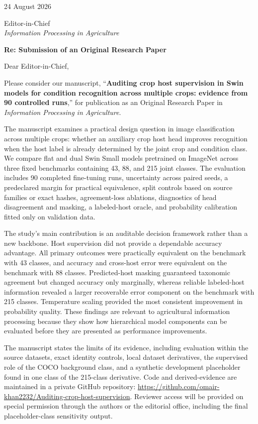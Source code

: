 \documentclass[10pt]{article}
\begin{document}
24 August 2026

Editor-in-Chief\\
\emph{Information Processing in Agriculture}

\textbf{Re: Submission of an Original Research Paper}

Dear Editor-in-Chief,

Please consider our manuscript, ``\textbf{Auditing crop host supervision in
Swin models for condition recognition across multiple crops: evidence from 90
controlled runs},'' for publication as an Original Research Paper in
\emph{Information Processing in Agriculture}.

The manuscript examines a practical design question in image classification
across multiple crops: whether an auxiliary crop host head improves recognition
when the host label is already determined by the joint crop and condition class.
We compare flat and dual Swin Small models pretrained on ImageNet across three
fixed benchmarks containing 43, 88, and 215 joint classes. The evaluation
includes 90 completed fine-tuning runs, uncertainty across paired seeds, a
predeclared margin for practical equivalence, split controls based on source
families or exact hashes, agreement-loss ablations, diagnostics of head
disagreement and masking, a labeled-host oracle, and probability calibration
fitted only on validation data.

The study's main contribution is an auditable decision framework rather than a
new backbone. Host supervision did not provide a dependable accuracy advantage.
All primary outcomes were practically equivalent on the benchmark with 43
classes, and accuracy and cross-host error were equivalent on the benchmark
with 88 classes. Predicted-host masking guaranteed taxonomic agreement but
changed accuracy only marginally, whereas reliable labeled-host information
revealed a larger recoverable error component on the benchmark with 215
classes. Temperature scaling provided the most consistent improvement in
probability quality. These findings are relevant to agricultural information
processing because they show how hierarchical model components can be evaluated
before they are presented as performance improvements.

The manuscript states the limits of its evidence, including evaluation within
the source datasets, exact identity controls, local dataset derivatives, the
supervised role of the COCO background class, and a synthetic development
placeholder found in one class of the 215-class derivative. Code and
derived-evidence are maintained in a private GitHub repository:
\url{https://github.com/omair-khan2232/Auditing-crop-host-supervision}. Reviewer
access will be provided on special permission through the authors or the
editorial office, including the final placeholder-class sensitivity output.
\end{document}
